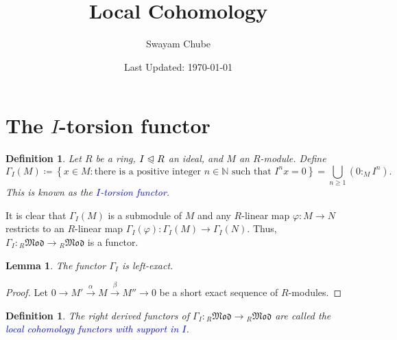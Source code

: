 \documentclass[10pt]{article}
\title{Local Cohomology}
\author{Swayam Chube}
\date{Last Updated: \today}
\theoremstyle{thmstyle}
\newtheorem{lemma}[theorem]{Lemma}
\theoremstyle{defstyle}
\newtheorem{definition}[theorem]{Definition}
\newcommand{\N}{\mathbb{N}}
\newcommand{\define}[1]{\textcolor{blue}{\textit{#1}}}
\renewcommand{\ge}{\geqslant}
\newcommand{\noreq}{\trianglelefteqslant}
\begin{document}
\maketitle

\section{The \texorpdfstring{$I$}{I}-torsion functor}

\begin{definition}
    Let $R$ be a ring, $I\noreq R$ an ideal, and $M$ an $R$-module. Define 
    \begin{equation*}
        \Gamma_I(M) \coloneq\left\{x\in M\colon \text{there is a positive integer $n\in\N$ such that }I^nx = 0\right\} = \bigcup_{n\ge 1}(0 :_M I^n).
    \end{equation*}
    This is known as the \define{$I$-torsion functor}.
\end{definition}

It is clear that $\Gamma_I(M)$ is a submodule of $M$ and any $R$-linear map $\varphi: M\to N$ restricts to an $R$-linear map $\Gamma_I(\varphi): \Gamma_I(M)\to\Gamma_I(N)$. Thus, $\Gamma_I: {}_R\mathfrak{Mod}\to{}_R\mathfrak{Mod}$ is a functor.

\begin{lemma}
	The functor $\Gamma_I$ is left-exact.
\end{lemma}
\begin{proof}
	Let $0\to M'\xrightarrow{\alpha} M\xrightarrow{\beta} M''\to 0$ be a short exact sequence of $R$-modules.
\end{proof}

\begin{definition}
	The right derived functors of $\Gamma_I: {}_R\mathfrak{Mod}\to{}_R\mathfrak{Mod}$ are called the \define{local cohomology functors with support in $I$}.
\end{definition}

\begin{center}
\end{center}
\end{document}
